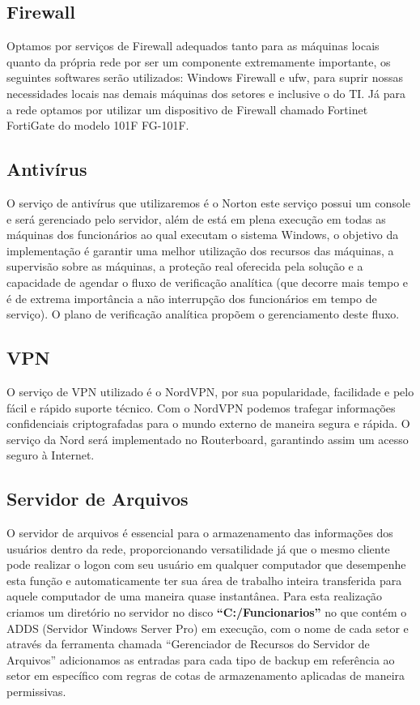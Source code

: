 \documentclass[12pt]{article}
\begin{document}
\subsection{Firewall}
Optamos por serviços de Firewall adequados tanto para as máquinas locais quanto da própria rede por ser um componente extremamente importante, os seguintes softwares serão utilizados: Windows Firewall e ufw, para suprir nossas necessidades locais nas demais máquinas dos setores e inclusive o do TI. Já para a rede optamos por utilizar um dispositivo de Firewall chamado Fortinet FortiGate do modelo 101F FG-101F.

\subsection{Antivírus}
O serviço de antivírus que utilizaremos é o Norton este serviço possui um console e será gerenciado pelo servidor, além de está em plena execução em todas as máquinas dos funcionários ao qual executam o sistema Windows, o objetivo da implementação é garantir uma melhor utilização dos recursos das máquinas, a supervisão sobre as máquinas, a proteção real oferecida pela solução e a capacidade de agendar o fluxo de verificação analítica (que decorre mais tempo e é de extrema importância a não interrupção dos funcionários em tempo de serviço). O plano de verificação analítica propõem o gerenciamento deste fluxo.

\subsection{VPN}
O serviço de VPN utilizado é o NordVPN, por sua popularidade, facilidade e pelo fácil e rápido suporte técnico. Com o NordVPN podemos trafegar informações confidenciais criptografadas para o mundo externo de maneira segura e rápida. O serviço da Nord será implementado no Routerboard, garantindo assim um acesso seguro à Internet.

\subsection{Servidor de Arquivos}
O servidor de arquivos é essencial para o armazenamento das informações dos usuários dentro da rede, proporcionando versatilidade já que o mesmo cliente pode realizar o logon com seu usuário em qualquer computador que desempenhe esta função e automaticamente ter sua área de trabalho inteira transferida para aquele computador de uma maneira quase instantânea. Para esta realização criamos um diretório no servidor no disco \textbf{“C:/Funcionarios”} no que contém o ADDS (Servidor Windows Server Pro) em execução, com o nome de cada setor e através da ferramenta chamada “Gerenciador de Recursos do Servidor de Arquivos” adicionamos as entradas para cada tipo de backup em referência ao setor em específico com regras de cotas de armazenamento aplicadas de maneira permissivas.
\end{document}
